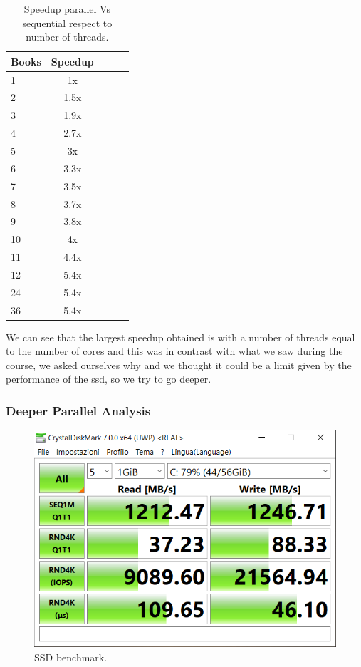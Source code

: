 \documentclass[10pt,twocolumn,letterpaper]{article}
\begin{document}
\begin{table}[H]
\begin{center}
\begin{tabular}{|l|c|c|c|c|}
\hline
Books & Speedup\\
\hline\hline
1 & 1x\\
2 & 1.5x\\
3 & 1.9x\\
4 & 2.7x\\
5 & 3x\\
6 & 3.3x\\
7 & 3.5x\\
8 & 3.7x\\
9 & 3.8x\\
10 & 4x\\
11 & 4.4x\\
12 & 5.4x\\
24 & 5.4x\\
36 & 5.4x\\
\hline
\end{tabular}
\end{center}
\caption{Speedup parallel Vs sequential respect to number of threads.}
\end{table}

We can see that the largest speedup obtained is with a number of threads equal to the number of cores and this was in contrast with what we saw during the course, we asked ourselves why and we thought it could be a limit given by the performance of the ssd, so we try to go deeper.
\subsubsection{Deeper Parallel Analysis}

\begin{figure}[H]
    \begin{center}
    \includegraphics[width=\columnwidth]{template/latex/SSDbech.png}
    \caption{SSD benchmark.}
    \label{fig:my_label}
    \end{center}
\end{figure}
\end{document}
